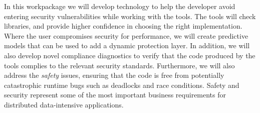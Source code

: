 \begin{Workpackage}{\thewpno}
 \begin{WPDescription}
 In this workpackage we will develop technology to help the developer
 avoid entering security vulnerabilities while working with the \TheProject
 tools. The \theWP{} tools will check libraries,
and provide higher
confidence in choosing the right implementation. Where the user
 compromises security for performance, we will create predictive models that
 can be used to add a dynamic protection layer. %
 In addition, we will also 
 develop novel compliance diagnostics to verify that the code produced by the
 \TheProject{} tools complies to the relevant security standards. Furthermore, we
 will also address the \emph{safety} issues, ensuring that the code is free from 
 potentially catastrophic runtime bugs such as deadlocks and race conditions. Safety and security represent some of the most important business requirements for distributed data-intensive applications.
 \end{WPDescription}



\end{Workpackage}
